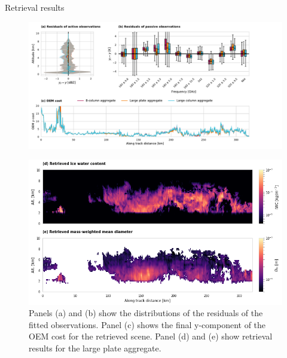 \documentclass[8pt, final,hyperref={pdfpagelabels=false}]{beamer}
\begin{document}
\begin{frame}
\begin{columns}[t]
    \begin{column}{.48\linewidth}

      \begin{block}{Retrieval results}
            \begin{figure}
            \centering
            \includegraphics[width = \textwidth]{../plots/fit_overview}
            \end{figure}
            \begin{figure}
            \centering
            \includegraphics[width = \textwidth]{../plots/hmc}
            \caption{Panels (a) and (b) show the distributions of the residuals of
              the fitted observations. Panel (c) shows the final y-component of the
              OEM cost for the retrieved scene. Panel (d) and (e) show retrieval results
              for the large plate aggregate.}
            \end{figure}
       \end{block}

      \vspace{-1cm}


\end{column}
\end{columns}
\end{frame}
\end{document}
